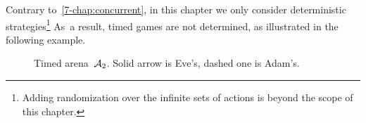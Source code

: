 

Contrary to~\cref{7-chap:concurrent}, in this chapter we only consider deterministic strategies\footnote{Adding randomization over the infinite sets of actions is beyond the scope of this chapter.}
  As~a result, timed games are not
determined, as illustrated in the following example.

\begin{figure}[ht]
  \centering
  \caption{Timed arena~$\mathcal{A}_2$. Solid arrow is Eve's, dashed one is Adam's.}
  \label{9-fig:ta2}
\end{figure}




